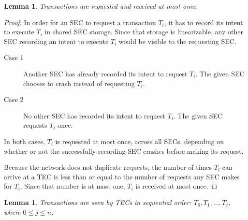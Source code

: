 \documentclass{article}
\newtheorem{lemma}[theorem]{Lemma}
\begin{document}
\begin{lemma}
\label{t_at_most_once}
Transactions are requested and received at most once.
\end{lemma}

\begin{proof}

In order for an SEC to request a transaction $T_i$, it has to record its intent
to execute $T_i$ in shared SEC storage. Since that storage is linearizable, any
other SEC recording an intent to execute $T_i$ would be visible to the
requesting SEC.

\begin{description}
  \item[Case 1] Another SEC has already recorded its intent to request $T_i$.
The given SEC chooses to crash instead of requesting $T_i$.
  \item[Case 2] No other SEC has recorded its intent to request $T_i$. The
given SEC requests $T_i$ once.
\end{description}

In both cases, $T_i$ is requested at most once, across all SECs, depending on
whether or not the successfully-recording SEC crashes before making its
request.

Because the network does not duplicate requests, the number of times $T_i$ can
arrive at a TEC is less than or equal to the number of requests any SEC makes
for $T_i$. Since that number is at most one, $T_i$ is received at most once.

\end{proof}


\begin{lemma}
\label{t_sequential}
Transactions are seen by TECs in sequential order: $T_0, T_1, \ldots, T_j$,
where $0 \le j \le n$.
\end{lemma}
\end{document}
